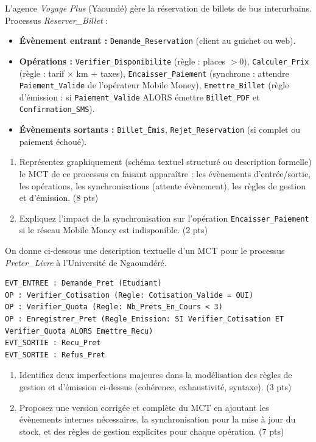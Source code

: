 \documentclass[11pt]{article}
\begin{document}
\begin{exercice}
L'agence \textit{Voyage Plus} (Yaoundé) gère la réservation de billets de bus interurbains. Processus \textit{Reserver\_Billet} :
\begin{itemize}
    \item \textbf{Évènement entrant :} \texttt{Demande\_Reservation} (client au guichet ou web).
    \item \textbf{Opérations :} \texttt{Verifier\_Disponibilite} (règle : places $> 0$), \texttt{Calculer\_Prix} (règle : tarif $\times$ km + taxes), \texttt{Encaisser\_Paiement} (synchrone : attendre \texttt{Paiement\_Valide} de l'opérateur Mobile Money), \texttt{Emettre\_Billet} (règle d'émission : si \texttt{Paiement\_Valide} ALORS émettre \texttt{Billet\_PDF} et \texttt{Confirmation\_SMS}).
    \item \textbf{Évènements sortants :} \texttt{Billet\_Émis}, \texttt{Rejet\_Reservation} (si complet ou paiement échoué).
\end{itemize}
\begin{enumerate}
    \item Représentez graphiquement (schéma textuel structuré ou description formelle) le MCT de ce processus en faisant apparaître : les évènements d'entrée/sortie, les opérations, les synchronisations (attente évènement), les règles de gestion et d'émission. (8 pts)
    \item Expliquez l'impact de la synchronisation sur l'opération \texttt{Encaisser\_Paiement} si le réseau Mobile Money est indisponible. (2 pts)
\end{enumerate}
\end{exercice}

\begin{exercice}
On donne ci-dessous une description textuelle d'un MCT pour le processus \textit{Preter\_Livre} à l'Université de Ngaoundéré. 
\begin{verbatim}
EVT_ENTREE : Demande_Pret (Etudiant)
OP : Verifier_Cotisation (Regle: Cotisation_Valide = OUI)
OP : Verifier_Quota (Regle: Nb_Prets_En_Cours < 3)
OP : Enregistrer_Pret (Regle_Emission: SI Verifier_Cotisation ET Verifier_Quota ALORS Emettre_Recu)
EVT_SORTIE : Recu_Pret
EVT_SORTIE : Refus_Pret
\end{verbatim}
\begin{enumerate}
    \item Identifiez deux imperfections majeures dans la modélisation des règles de gestion et d'émission ci-dessus (cohérence, exhaustivité, syntaxe). (3 pts)
    \item Proposez une version corrigée et complète du MCT en ajoutant les évènements internes nécessaires, la synchronisation pour la mise à jour du stock, et des règles de gestion explicites pour chaque opération. (7 pts)
\end{enumerate}
\end{exercice}
\end{document}
